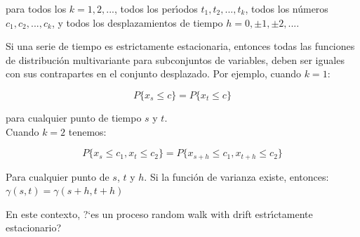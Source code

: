 	para todos los $k = 1,2, ...$, todos los per\'\i{}odos $t_1, t_2, ..., t_k$, todos los n\'umeros $c_1, c_2, ..., c_k$, y todos los desplazamientos de tiempo $h = 0, \pm 1, \pm 2 , ....$
	

Si una serie de tiempo es estrictamente estacionaria, entonces todas las funciones de distribuci\'on multivariante para subconjuntos de variables, deben ser iguales con sus contrapartes en el conjunto desplazado. Por ejemplo, cuando $k = 1$:

\begin{equation*}
P \{x_s \le c\} = P \{x_t \le c\}
\end{equation*}

para cualquier punto de tiempo $s$ y $t$. \\

Cuando $k=2$ tenemos:

\begin{equation*}
P \{x_s \le c_1, x_t \le  c_2\} = P \{x_{s+h} \le c_1, x_{t+h} \le  c_2\} 
\end{equation*}

Para cualquier punto de $s$, $t$ y $h$. Si la funci\'on de varianza existe, entonces: $\gamma(s,t)=\gamma(s+h,t+h)$

En este contexto, ?`es un proceso random walk with drift estr\'\i{}ctamente estacionario?\\


